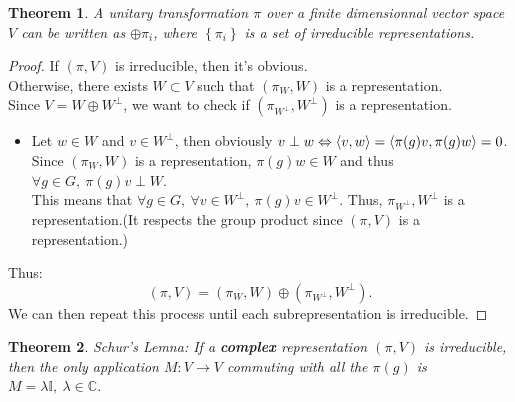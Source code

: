 \documentclass[11pt,a4paper]{article}
\newtheorem{theorem}{Theorem}[section]
\theoremstyle{definition}
\numberwithin{equation}{section}
\begin{document}
\begin{theorem}
    A unitary transformation $\pi$ over a finite dimensionnal vector space $V$ can be written as $\oplus \pi_i $, where $\left\{\pi_i\right\}$ is a set of irreducible representations.
\end{theorem}
\begin{proof}
    If $(\pi,V)$ is irreducible, then it's obvious.\\
    Otherwise, there exists $W \subset V$ such that $(\pi_W,W)$ is a representation.  \\
    Since $V = W  \oplus W^\perp$, we want to check if $(\pi_{W^\perp},W^\perp)$ is a representation.
    \begin{itemize}
        \item Let $w \in W$ and $v \in W^\perp$, then obviously $v \perp w \Leftrightarrow \expval{v,w} = \expval{\pi(g)v,\pi(g)w}= 0$. Since $(\pi_W,W)$ is a representation, $\pi(g)w \in W$ and thus $\forall g \in G,\ \pi(g)v \perp W $. \\
        This means that $\forall g \in G,\ \forall v \in W^\perp,\ \pi(g)v \in W^\perp$. Thus, $\pi_{W^\perp},W^\perp$ is a representation.(It respects the group product since $(\pi,V)$ is a representation.)
    \end{itemize}
    Thus:\begin{equation*}
        (\pi,V) = (\pi_W,W)\oplus(\pi_{W^\perp},W^\perp).
    \end{equation*}
    We can then repeat this process until each subrepresentation is irreducible.
\end{proof}
\begin{theorem}{Schur's Lemna:}
    If a \textbf{complex} representation $(\pi,V)$ is irreducible, then the only application $M:V\rightarrow V$ commuting with all the $\pi(g)$ is $M = \lambda \mathbb{I},\ \lambda \in \mathbb{C}$. 
\end{theorem}
\end{document}

